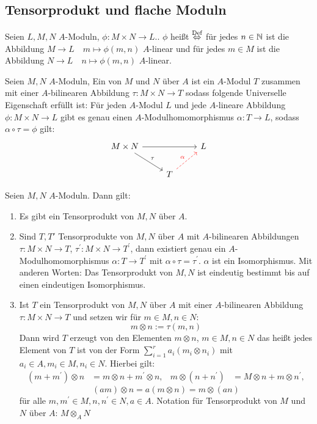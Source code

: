 \subsection{ Tensorprodukt und flache Moduln}
\begin{df}
	Seien $L,M,N$ $A$-Moduln, $\phi: M \times N \to L. $. $ \phi$  heißt  $\overset{\text{Def}}{\Leftrightarrow}$ für jedes $n \in \mathbb{N} $ ist die Abbildung $M \to L \quad m \mapsto \phi(m,n) $ $A$-linear und für jedes $m \in M $ ist die Abbildung $ N \to L \quad n \mapsto \phi(m,n)  $ $A$-linear.
\end{df}
\begin{df} 
	Seien $M,N$ $A$-Moduln, Ein  von $M$ und $N$ über $A$ ist ein $A$-Modul $T$ zusammen mit einer $A$-bilinearen Abbildung $\tau: M \times N \to T $ sodass folgende Universelle Eigenschaft erfüllt ist: Für jeden $A$-Modul $L$ und jede $A$-lineare Abbildung $\phi: M \times N \to L $ gibt es genau einen $A$-Modulhomomorphismus $\alpha:  T \to L $, sodass $\alpha \circ \tau = \phi$ gilt:
	$$\begin{tikzcd}
	M \times N  \arrow{rr} \arrow{dr}{\tau} && L \\
	& T \arrow[dashed, red]{ur}{\alpha}&
	\end{tikzcd}$$
\end{df}
\begin{sa} \label{13.3}
	Seien $M,N $ $A$-Moduln. Dann gilt: 
	\begin{enumerate} [label= \alph*)]
		\item Es gibt ein Tensorprodukt von $M,N$ über $A$.
		\item Sind $T,T'$ Tensorprodukte von $M,N$ über $A$ mit $ A$-bilinearen Abbildungen $\tau: M \times N \to T$, $\tau^{'}: M \times N \to T^{'}$, dann existiert genau ein $A$-Modulhomomorphismus $\alpha: T \to T^{'} $ mit $\alpha \circ \tau = \tau^{'}. $ $ \alpha $ ist ein Isomorphismus. Mit anderen Worten: Das Tensorprodukt von $M,N$ ist eindeutig bestimmt bis auf einen eindeutigen Isomorphismus. 
		\item Ist $T$ ein Tensorprodukt von $M,N$ über $A$ mit einer $A$-bilinearen Abbildung $\tau: M \times N \to T $ und setzen wir für $m \in M, n \in N$: 
		$$ m \otimes n  := \tau(m,n)$$
		Dann wird $T$ erzeugt von den Elementen $m \otimes n $, $m \in M, n \in N $ das heißt jedes Element von $T$ ist von der Form $\sum_{i=1}^{r} a_i (m_i \otimes n_i) $ mit $ a_i \in A, m_i \in M , n_i \in N $. 
		Hierbei gilt:
		 \begin{align*}
		 (m +m^{'}) \otimes n &= m \otimes n + m^{'} \otimes n,&
		  m \otimes (n+n^{'}) &= M \otimes n + m \otimes n^{'},\end{align*}
		 $$(am) \otimes n = a ( m \otimes n ) = m \otimes (an) $$
	   für alle $m,m^{'} \in M, n,n^{'} \in N, a\in A $. Notation für Tensorprodukt von $M$ und $N$ über $A$: $M \otimes_A N $
	\end{enumerate}
\end{sa}
